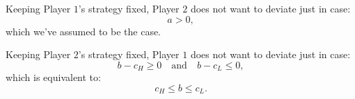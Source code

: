 \documentclass[
    preview, 
    varwidth=7cm, 
    border={0pt 1pt 1pt 1pt}
    ]{standalone} %
\begin{document}
\raggedright








    Keeping Player \(1\)'s strategy fixed, Player \(2\) does not want to deviate 
    just in case:
    \[
        a > 0,
    \]
    which we've assumed to be the case.

    \vspace{0.2cm}
    Keeping Player \(2\)'s strategy fixed, Player \(1\) does not want to deviate
    just in case:
    \[
        b - c_H \geq 0 \quad \text{and} \quad b - c_L \leq 0,
    \]
    which is equivalent to:
    \[
        c_H \leq b \leq c_L.
    \]
\end{document}
